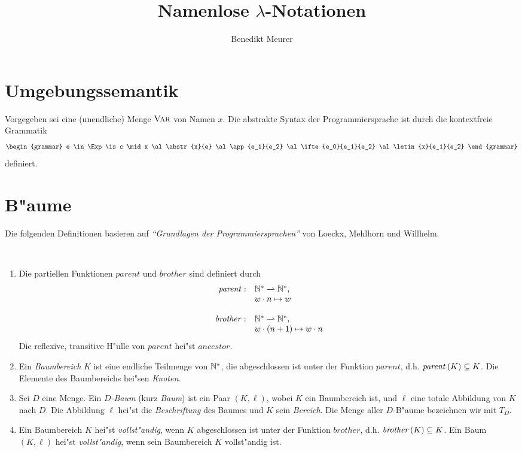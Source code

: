 \documentclass[12pt,a4paper]{article}
\begin{document}
\title{Namenlose $\lambda$-Notationen}
\author{Benedikt Meurer}
\maketitle


\section{Umgebungssemantik}

Vorgegeben sei eine (unendliche) Menge $\textsc{Var}$ von Namen $x$. Die abstrakte Syntax der Programmiersprache
ist durch die kontextfreie Grammatik
\[\begin{grammar}
  e \in \Exp
  \is c \mid x
  \al \abstr{x}{e}
  \al \app{e_1}{e_2}
  \al \ifte{e_0}{e_1}{e_2}
  \al \letin{x}{e_1}{e_2}
\end{grammar}\]
definiert.


\section{B"aume}

Die folgenden Definitionen basieren auf \emph{``Grundlagen der Programmiersprachen''} von Loeckx,
Mehlhorn und Willhelm.
\begin{definition} \
  \begin{enumerate}
  \item Die partiellen Funktionen $\mathit{parent}$ und $\mathit{brother}$ sind definiert durch
    \[\begin{array}{rl}
      \mathit{parent}: & \mathbb N^* \rightharpoonup \mathbb N^*, \\
      & w \cdot n \mapsto w \\
      \\
      \mathit{brother}: & \mathbb N^* \rightharpoonup \mathbb N^*, \\
      & w \cdot (n+1) \mapsto w \cdot n \\
    \end{array}\]
    Die reflexive, transitive H"ulle von $\mathit{parent}$ hei"st $\mathit{ancestor}$.
  \item Ein \emph{Baumbereich} $K$ ist eine endliche Teilmenge von $\mathbb N^*$, die abgeschlossen
    ist unter der Funktion $\mathit{parent}$, d.h. $\mathit{parent}\,(K) \subseteq K$. Die Elemente des
    Baumbereichs hei"sen \emph{Knoten}.
  \item Sei $D$ eine Menge. Ein \emph{$D$-Baum} (kurz \emph{Baum}) ist ein Paar $(K,\ell)$,
    wobei $K$ ein Baumbereich ist, und $\ell$ eine totale Abbildung von $K$ nach $D$. Die
    Abbildung $\ell$ hei"st die \emph{Beschriftung} des Baumes und $K$ sein \emph{Bereich}.
    Die Menge aller $D$-B"aume bezeichnen wir mit $T_D$.
  \item Ein Baumbereich $K$ hei"st \emph{vollst"andig}, wenn $K$ abgeschlossen ist unter der
    Funktion $\mathit{brother}$, d.h. $\mathit{brother}\,(K) \subseteq K$. Ein Baum $(K,\ell)$ hei"st
    \emph{vollst"andig}, wenn sein Baumbereich $K$ vollst"andig ist.
  \end{enumerate}
\end{definition}
\end{document}
